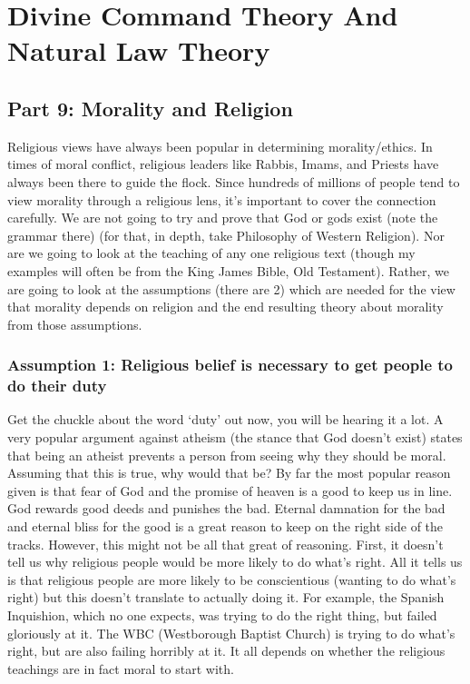 \part{Divine Command Theory And Natural Law Theory}
\label{ch.mod3}
\chapter{Part 9: Morality and Religion}
Religious views have always been popular in determining morality/ethics. In times of moral conflict, religious leaders like Rabbis, Imams, and Priests have always been there to guide the flock. Since hundreds of millions of people tend to view morality through a religious lens, it’s important to cover the connection carefully. We are not going to try and prove that God or gods exist (note the grammar there) (for that, in depth, take Philosophy of Western Religion). Nor are we going to look at the teaching of any one religious text (though my examples will often be from the King James Bible, Old Testament).  Rather, we are going to look at the assumptions (there are 2) which are needed for the view that morality depends on religion and the end resulting theory about morality from those assumptions.
\section{Assumption 1: Religious belief is necessary to get people to do their duty}

Get the chuckle about the word `duty' out now, you will be hearing it a lot. A very popular argument against atheism (the stance that God doesn’t exist) states that being an atheist prevents a person from seeing why they should be moral. Assuming that this is true, why would that be? By far the most popular reason given is that fear of God and the promise of heaven is a good to keep us in line. God rewards good deeds and punishes the bad. Eternal damnation for the bad and eternal bliss for the good is a great reason to keep on the right side of the tracks. However, this might not be all that great of reasoning. First, it doesn’t tell us why religious people would be more likely to do what’s right. All it tells us is that religious people are more likely to be conscientious (wanting to do what’s right) but this doesn’t translate to actually doing it. For example, the Spanish Inquishion, which no one expects, was trying to do the right thing, but failed gloriously at it. The WBC (Westborough Baptist Church) is trying to do what’s right, but are also failing horribly at it. It all depends on whether the religious teachings are in fact moral to start with.
